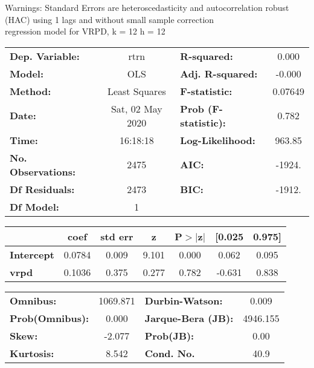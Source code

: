 Warnings: \newline
 [1] Standard Errors are heteroscedasticity and autocorrelation robust (HAC) using 1 lags and without small sample correction\\ 

regression model for VRPD, k = 12 h = 12\begin{center}
\begin{tabular}{lclc}
\toprule
\textbf{Dep. Variable:}    &       rtrn       & \textbf{  R-squared:         } &     0.000   \\
\textbf{Model:}            &       OLS        & \textbf{  Adj. R-squared:    } &    -0.000   \\
\textbf{Method:}           &  Least Squares   & \textbf{  F-statistic:       } &   0.07649   \\
\textbf{Date:}             & Sat, 02 May 2020 & \textbf{  Prob (F-statistic):} &    0.782    \\
\textbf{Time:}             &     16:18:18     & \textbf{  Log-Likelihood:    } &    963.85   \\
\textbf{No. Observations:} &        2475      & \textbf{  AIC:               } &    -1924.   \\
\textbf{Df Residuals:}     &        2473      & \textbf{  BIC:               } &    -1912.   \\
\textbf{Df Model:}         &           1      & \textbf{                     } &             \\
\bottomrule
\end{tabular}
\begin{tabular}{lcccccc}
                   & \textbf{coef} & \textbf{std err} & \textbf{z} & \textbf{P$> |$z$|$} & \textbf{[0.025} & \textbf{0.975]}  \\
\midrule
\textbf{Intercept} &       0.0784  &        0.009     &     9.101  &         0.000        &        0.062    &        0.095     \\
\textbf{vrpd}      &       0.1036  &        0.375     &     0.277  &         0.782        &       -0.631    &        0.838     \\
\bottomrule
\end{tabular}
\begin{tabular}{lclc}
\textbf{Omnibus:}       & 1069.871 & \textbf{  Durbin-Watson:     } &    0.009  \\
\textbf{Prob(Omnibus):} &   0.000  & \textbf{  Jarque-Bera (JB):  } & 4946.155  \\
\textbf{Skew:}          &  -2.077  & \textbf{  Prob(JB):          } &     0.00  \\
\textbf{Kurtosis:}      &   8.542  & \textbf{  Cond. No.          } &     40.9  \\
\bottomrule
\end{tabular}
\end{center}

